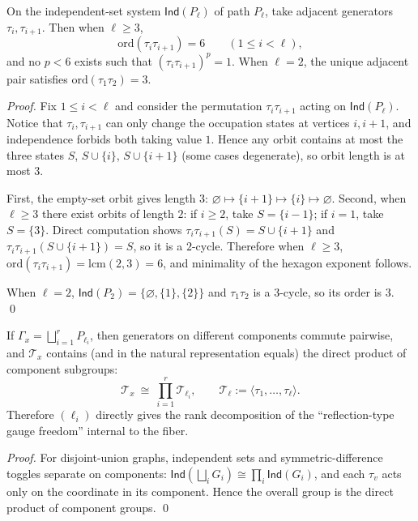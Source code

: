 \begin{proposition}\label{prop:pom-toggle-adjacent-order-exact}
On the independent-set system \(\mathsf{Ind}(P_\ell)\) of path \(P_{\ell}\), take adjacent generators \(\tau_i,\tau_{i+1}\).
Then when \(\ell\ge 3\),
\[
\mathrm{ord}(\tau_i\tau_{i+1})=6\qquad(1\le i<\ell),
\]
and no \(p<6\) exists such that \((\tau_i\tau_{i+1})^p=1\).
When \(\ell=2\), the unique adjacent pair satisfies \(\mathrm{ord}(\tau_1\tau_2)=3\).
\end{proposition}
\begin{proof}
Fix \(1\le i<\ell\) and consider the permutation \(\tau_i\tau_{i+1}\) acting on \(\mathsf{Ind}(P_\ell)\).
Notice that \(\tau_i,\tau_{i+1}\) can only change the occupation states at vertices \(i,i+1\), and independence forbids both taking value \(1\).
Hence any orbit contains at most the three states \(S\), \(S\cup\{i\}\), \(S\cup\{i+1\}\) (some cases degenerate), so orbit length is at most \(3\).

First, the empty-set orbit gives length \(3\):
\(
\varnothing\mapsto \{i+1\}\mapsto \{i\}\mapsto \varnothing
\).
Second, when \(\ell\ge 3\) there exist orbits of length \(2\): if \(i\ge 2\), take \(S=\{i-1\}\);
if \(i=1\), take \(S=\{3\}\).
Direct computation shows \(\tau_i\tau_{i+1}(S)=S\cup\{i+1\}\) and \(\tau_i\tau_{i+1}(S\cup\{i+1\})=S\), so it is a \(2\)-cycle.
Therefore when \(\ell\ge 3\), \(\mathrm{ord}(\tau_i\tau_{i+1})=\mathrm{lcm}(2,3)=6\), and minimality of the hexagon exponent follows.

When \(\ell=2\), \(\mathsf{Ind}(P_2)=\{\varnothing,\{1\},\{2\}\}\) and \(\tau_1\tau_2\) is a \(3\)-cycle, so its order is \(3\). \qed
\end{proof}

\begin{corollary}\label{cor:pom-toggle-product-components}
If \(\Gamma_x=\bigsqcup_{i=1}^r P_{\ell_i}\), then generators on different components commute pairwise, and \(\mathcal T_x\) contains (and in the natural representation equals) the direct product of component subgroups:
\[
\mathcal T_x\ \cong\ \prod_{i=1}^r \mathcal T_{\ell_i},
\qquad
\mathcal T_{\ell}:=\langle \tau_1,\dots,\tau_{\ell}\rangle.
\]
Therefore \((\ell_i)\) directly gives the rank decomposition of the ``reflection-type gauge freedom'' internal to the fiber.
\end{corollary}
\begin{proof}
For disjoint-union graphs, independent sets and symmetric-difference toggles separate on components: \(\mathsf{Ind}(\bigsqcup_i G_i)\cong\prod_i\mathsf{Ind}(G_i)\), and each \(\tau_v\) acts only on the coordinate in its component.
Hence the overall group is the direct product of component groups. \qed
\end{proof}

